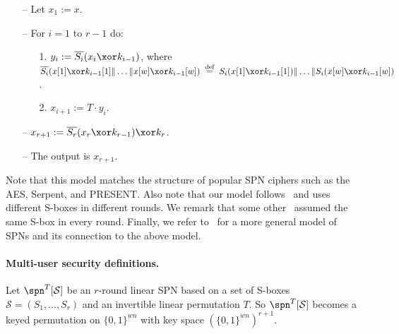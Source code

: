 \begin{itemize}
  \item[--]
  Let $x_1 := x$.
  \item[--]
  For $i = 1$ to $r-1$ do:
  \begin{itemize}
  	\item[1.] $y_{i} := \overline{S_i}(x_{i}\xor k_{i-1})$, where $\overline{S_i}(x[1]\xor k_{i-1}[1]\|\ldots\| x[w]\xor k_{i-1}[w]) \stackrel{\text { def }}{=} S_i(x[1]\xor k_{i-1}[1])\|\ldots\| S_i(x[w]\xor k_{i-1}[w])$.
    \item[2.] 
    $x_{i + 1} := T\cdot y_i$.
  \end{itemize}
  \item[--] $x_{r+1} := \overline{S_r}(x_r\xor k_{r-1})\xor k_r$.
  \item[--]
  The output is $x_{r+1}$.
\end{itemize}

Note that this model matches the structure of popular SPN ciphers such as the AES, Serpent, and PRESENT. Also note that our model follows~\cite[Sect. 4.2]{C:CDKLST18} and uses different S-boxes in different rounds. We remark that some other~\cite[Sect. 3]{C:CDKLST18} assumed the same S-box in every round. Finally, we refer to~\cite[Sect. 2.1]{EPRINT:DKSTZ17} for a more general model of SPNs and its connection to the above model.











%

\paragraph{Multi-user security definitions.}


Let $\spn^T[\mathcal{S}]$ be an $r$-round linear SPN based on a set of S-boxes $\mathcal{S}=(S_1, \ldots  ,S_r)$ and an invertible linear permutation $T$. So $\spn^T[\mathcal{S}]$
becomes a keyed permutation on $\{0, 1\}^{wn}$ with key space $(\{0,1\}^{wn})^{r+1}$.


